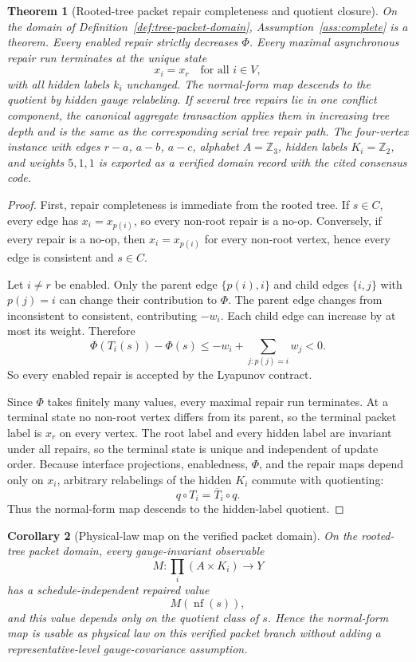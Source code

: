 \documentclass[11pt]{article}
\newtheorem{theorem}{Theorem}[section]
\newtheorem{corollary}[theorem]{Corollary}
\theoremstyle{remark}
\theoremstyle{plain}
\begin{document}
\begin{theorem}[Rooted-tree packet repair completeness and quotient closure]\label{thm:tree-packet-domain}
On the domain of Definition~\ref{def:tree-packet-domain}, Assumption~\ref{ass:complete} is a
theorem. Every enabled repair strictly decreases \(\Phi\). Every maximal asynchronous repair run
terminates at the unique state
\[
x_i=x_r\quad\text{for all }i\in V,
\]
with all hidden labels \(k_i\) unchanged. The normal-form map descends to the quotient by hidden
gauge relabeling. If several tree repairs lie in one conflict component, the canonical aggregate
transaction applies them in increasing tree depth and is the same as the corresponding serial
tree repair path. The four-vertex instance with edges \(r\!-\!a\), \(a\!-\!b\), \(a\!-\!c\),
alphabet \(A=\mathbb Z_3\), hidden labels \(K_i=\mathbb Z_2\), and weights \(5,1,1\) is exported
as a verified domain record with the cited consensus code.
\end{theorem}

\begin{proof}
First, repair completeness is immediate from the rooted tree. If \(s\in C\), every edge has
\(x_i=x_{p(i)}\), so every non-root repair is a no-op. Conversely, if every repair is a no-op,
then \(x_i=x_{p(i)}\) for every non-root vertex, hence every edge is consistent and \(s\in C\).

Let \(i\ne r\) be enabled. Only the parent edge \(\{p(i),i\}\) and child edges
\(\{i,j\}\) with \(p(j)=i\) can change their contribution to \(\Phi\). The parent edge changes
from inconsistent to consistent, contributing \(-w_i\). Each child edge can increase by at most
its weight. Therefore
\[
\Phi(T_i(s))-\Phi(s)
\le
-w_i+\sum_{j:p(j)=i}w_j
<0.
\]
So every enabled repair is accepted by the Lyapunov contract.

Since \(\Phi\) takes finitely many values, every maximal repair run terminates. At a terminal
state no non-root vertex differs from its parent, so the terminal packet label is \(x_r\) on every
vertex. The root label and every hidden label are invariant under all repairs, so the terminal
state is unique and independent of update order. Because interface projections, enabledness,
\(\Phi\), and the repair maps depend only on \(x_i\), arbitrary relabelings of the hidden
\(K_i\) commute with quotienting:
\[
q\circ T_i=\overline T_i\circ q.
\]
Thus the normal-form map descends to the hidden-label quotient.
\end{proof}

\begin{corollary}[Physical-law map on the verified packet domain]\label{cor:tree-packet-law}
On the rooted-tree packet domain, every gauge-invariant observable
\[
M:\prod_i(A\times K_i)\to Y
\]
has a schedule-independent repaired value
\[
M(\operatorname{nf}(s)),
\]
and this value depends only on the quotient class of \(s\). Hence the normal-form map is
usable as physical law on this verified packet branch without adding a representative-level
gauge-covariance assumption.
\end{corollary}
\end{document}
